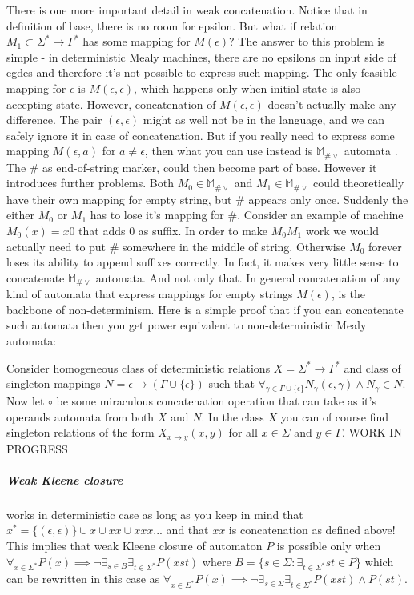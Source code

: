 \documentclass[12pt]{article}
\begin{document}
There is one more important detail in weak concatenation. Notice that in definition of base, there is no room for epsilon. But what if relation $M_1 \subset \Sigma^* \rightarrow \Gamma^*$ has some mapping for $M(\epsilon)$? The answer to this problem is simple - in deterministic Mealy machines, there are no epsilons on input side of egdes and therefore it's not possible to express such mapping. The only feasible mapping for $\epsilon$ is $M(\epsilon,\epsilon)$, which happens only when initial state is also accepting state. However, concatenation of $M(\epsilon,\epsilon)$ doesn't actually make any difference. The pair $(\epsilon,\epsilon)$ might as well not be in the language, and we can safely ignore it in case of concatenation.  But if you really need to express some mapping $M(\epsilon,a)$ for $a\ne\epsilon$, then what you can use instead is $\mathbb{M}_{\#\vee}$ automata . The $\#$ as end-of-string marker,  could then become part of base. However it introduces further problems. Both $M_0 \in \mathbb{M}_{\#\vee}$ and $M_1 \in \mathbb{M}_{\#\vee}$ could theoretically have their own mapping for empty string, but $\#$ appears only once. Suddenly the either $M_0$ or $M_1$ has to lose it's mapping for $\#$. Consider an example of machine $M_0(x)=x0$ that adds 0 as suffix. In order to make $M_0M_1$ work we would actually need to put $\#$ somewhere in the middle of string. Otherwise $M_0$ forever loses its ability to append suffixes correctly. In fact, it makes very little sense to concatenate $\mathbb{M}_{\#\vee}$ automata. And not only that. In general concatenation of any kind of automata that express mappings for empty strings $M(\epsilon)$, is the backbone of non-determinism. Here is a simple proof that if you can concatenate such automata then you get power equivalent to non-deterministic Mealy automata:


Consider homogeneous class of deterministic relations $X = \Sigma^* \rightarrow \Gamma^*$ and class of singleton mappings $N = \epsilon \rightarrow (\Gamma\cup\{\epsilon\})$ such that $\forall_{\gamma\in\Gamma\cup\{\epsilon\}}N_\gamma(\epsilon,\gamma) \wedge N_\gamma  \in N$. Now let $\circ$ be some miraculous concatenation operation that can take as it's operands automata from both $X$ and $N$. In the class $X$ you can of course find singleton relations of the form $X_{x\rightarrow y}(x,y)$ for all $x\in \Sigma$ and $y \in \Gamma$. WORK IN PROGRESS



\subparagraph{Weak Kleene closure}  works in deterministic case as long as you keep in mind that $x^* = \{(\epsilon,\epsilon) \} \cup x \cup xx \cup xxx ...$ and that $xx$ is concatenation as defined above! This implies that weak Kleene closure of automaton $P$ is possible only when $\forall_{x\in \Sigma^*} P(x) \implies \neg \exists_{s\in B} \exists_{t\in\Sigma^*} P(xst)$ where $B = \{s\in\Sigma : \exists_{t\in\Sigma^*}st\in P\}$ which can be rewritten in this case as  $\forall_{x\in \Sigma^*} P(x) \implies \neg \exists_{s\in \Sigma} \exists_{t\in\Sigma^*} P(xst) \wedge P(st)$. 
\end{document}
